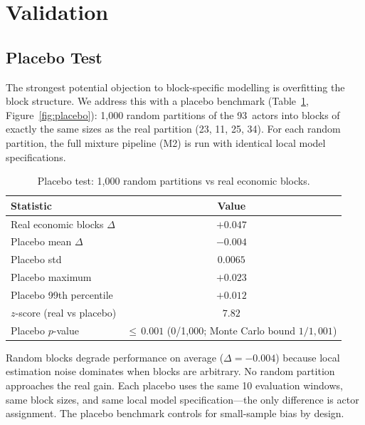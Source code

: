 \documentclass[11pt,a4paper]{article}
\begin{document}


\section{Validation}
\label{sec:validation}

\subsection{Placebo Test}
\label{sec:placebo}

The strongest potential objection to block-specific modelling is overfitting the block structure. We address this with a placebo benchmark (Table~\ref{tab:placebo}, Figure~\ref{fig:placebo}): 1{,}000 random partitions of the 93~actors into blocks of exactly the same sizes as the real partition (23, 11, 25, 34). For each random partition, the full mixture pipeline (M2) is run with identical local model specifications.

\begin{table}[H]
\centering
\caption{Placebo test: 1{,}000 random partitions vs real economic blocks.}
\label{tab:placebo}
\small
\begin{tabular}{lc}
\toprule
Statistic & Value \\
\midrule
Real economic blocks $\Delta$ & $+0.047$ \\
Placebo mean $\Delta$ & $-0.004$ \\
Placebo std & $0.0065$ \\
Placebo maximum & $+0.023$ \\
Placebo 99th percentile & $+0.012$ \\
$z$-score (real vs placebo) & $7.82$ \\
Placebo $p$-value & ${\le}\,0.001$ (0/1{,}000; Monte Carlo bound $1/1{,}001$) \\
\bottomrule
\end{tabular}
\end{table}

Random blocks degrade performance on average ($\Delta = -0.004$) because local estimation noise dominates when blocks are arbitrary. No random partition approaches the real gain. Each placebo uses the same 10 evaluation windows, same block sizes, and same local model specification---the only difference is actor assignment. The placebo benchmark controls for small-sample bias by design.
\end{document}
